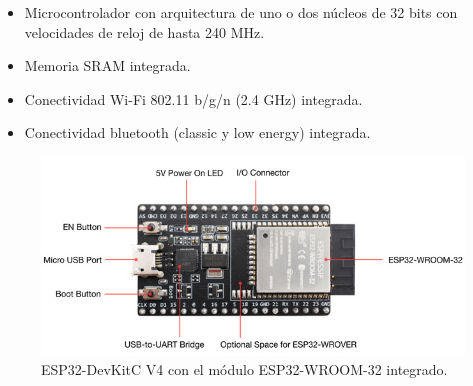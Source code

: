 \begin{itemize}
	\item Microcontrolador con arquitectura de uno o dos núcleos de 32 bits con velocidades de reloj de hasta 240 MHz.
	\item Memoria SRAM integrada.
	\item Conectividad Wi-Fi 802.11 b/g/n (2.4 GHz) integrada.
	\item Conectividad bluetooth (classic y low energy) integrada.
\end{itemize}

\begin{figure}[h]
\centering
\includegraphics[scale=.5]{./Figures/devkit.png}
	\caption{ESP32-DevKitC V4 con el módulo ESP32-WROOM-32 integrado\protect\footnotemark.}
	\label{fig:devkit}
\end{figure}




